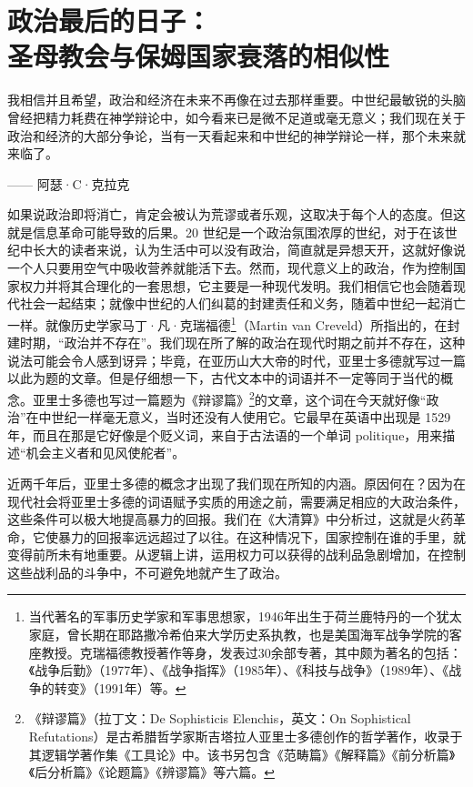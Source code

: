 \chapter[政治最后的日子]{政治最后的日子：\\ 圣母教会与保姆国家衰落的相似性}

\begin{tcolorbox}
\kaishu 我相信并且希望，政治和经济在未来不再像在过去那样重要。中世纪最敏锐的头脑曾经把精力耗费在神学辩论中，如今看来已是微不足道或毫无意义；我们现在关于政治和经济的大部分争论，当有一天看起来和中世纪的神学辩论一样，那个未来就来临了。
\begin{flushright}
—— 阿瑟·C·克拉克
\end{flushright}
\end{tcolorbox}

如果说政治即将消亡，肯定会被认为荒谬或者乐观，这取决于每个人的态度。但这就是信息革命可能导致的后果。20 世纪是一个政治氛围浓厚的世纪，对于在该世纪中长大的读者来说，认为生活中可以没有政治，简直就是异想天开，这就好像说一个人只要用空气中吸收营养就能活下去。然而，现代意义上的政治，作为控制国家权力并将其合理化的一套思想，它主要是一种现代发明。我们相信它也会随着现代社会一起结束；就像中世纪的人们纠葛的封建责任和义务，随着中世纪一起消亡一样。就像历史学家马丁·凡·克瑞福德\footnote{当代著名的军事历史学家和军事思想家，1946年出生于荷兰鹿特丹的一个犹太家庭，曾长期在耶路撒冷希伯来大学历史系执教，也是美国海军战争学院的客座教授。克瑞福德教授著作等身，发表过30余部专著，其中颇为著名的包括：《战争后勤》（1977年）、《战争指挥》（1985年）、《科技与战争》（1989年）、《战争的转变》（1991年）等。}（Martin van Creveld）所指出的，在封建时期，“政治并不存在”。我们现在所了解的政治在现代时期之前并不存在，这种说法可能会令人感到讶异；毕竟，在亚历山大大帝的时代，亚里士多德就写过一篇以此为题的文章。但是仔细想一下，古代文本中的词语并不一定等同于当代的概念。亚里士多德也写过一篇题为《辩谬篇》\footnote{《辩谬篇》（拉丁文：De Sophisticis Elenchis，英文：On Sophistical Refutations）是古希腊哲学家斯吉塔拉人亚里士多德创作的哲学著作，收录于其逻辑学著作集《工具论》中。该书另包含《范畴篇》《解释篇》《前分析篇》《后分析篇》《论题篇》《辨谬篇》等六篇。}的文章，这个词在今天就好像“政治”在中世纪一样毫无意义，当时还没有人使用它。它最早在英语中出现是 1529 年，而且在那是它好像是个贬义词，来自于古法语的一个单词 politique，用来描述“机会主义者和见风使舵者”。

近两千年后，亚里士多德的概念才出现了我们现在所知的内涵。原因何在？因为在现代社会将亚里士多德的词语赋予实质的用途之前，需要满足相应的大政治条件，这些条件可以极大地提高暴力的回报。我们在《大清算》中分析过，这就是火药革命，它使暴力的回报率远远超过了以往。在这种情况下，国家控制在谁的手里，就变得前所未有地重要。从逻辑上讲，运用权力可以获得的战利品急剧增加，在控制这些战利品的斗争中，不可避免地就产生了政治。

